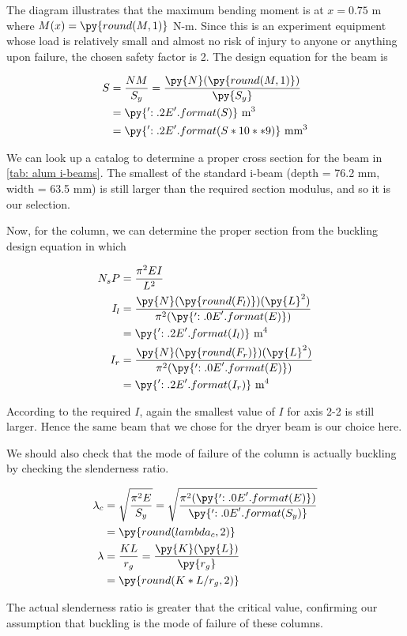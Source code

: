 \documentclass[
10pt,
a4paper,
openany,
svgnames,
]{book}
\begin{document}
\begin{solution}
  The diagram illustrates that the maximum bending moment is at $x = 0.75$ m where $M(x) = \py{round(M,1)}$ N-m. Since this is an experiment equipment whose load is relatively small and almost no risk of injury to anyone or anything upon failure, the chosen safety factor is 2. The design equation for the beam is

  \begin{align*}
    S &= \frac{N M}{S_y} = \frac{\py{N}(\py{round(M,1)})}{\py{S_y}} \\
      &= \py{'{:.2E}'.format(S)} \text{ m}^3 \\
      &= \py{'{:.2E}'.format(S*10**9)} \text{ mm}^3
  \end{align*}

  We can look up a catalog to determine a proper cross section for the beam in \cref{tab: alum i-beams}. The smallest of the standard i-beam (depth = 76.2 mm, width = 63.5 mm) is still larger than the required section modulus, and so it is our selection.

  Now, for the column, we can determine the proper section from the buckling design equation in which

  \begin{align*}
    N_s P &= \frac{\pi^2 EI}{L^2} \\
    I_l &= \frac{\py{N}(\py{round(F_l)})(\py{L}^2)}{\pi^2 (\py{'{:.0E}'.format(E)})} \\
          &= \py{'{:.2E}'.format(I_l)} \text{ m}^4 \\
    I_r &= \frac{\py{N}(\py{round(F_r)})(\py{L}^2)}{\pi^2 (\py{'{:.0E}'.format(E)})} \\
          &= \py{'{:.2E}'.format(I_r)} \text{ m}^4
  \end{align*}

  According to the required $I$, again the smallest value of $I$ for axis 2-2 is still larger. Hence the same beam that we chose for the dryer beam is our choice here.

  We should also check that the mode of failure of the column is actually buckling by checking the slenderness ratio.

  \begin{align*}
    \lambda_c &= \sqrt{ \frac{ \pi^2 E }{S_y}} = \sqrt{ \frac{ \pi^2 (\py{'{:.0E}'.format(E)}) }{\py{'{:.0E}'.format(S_y)}}} \\
              &= \py{round(lambda_c,2)} \\
    \lambda &= \frac{KL}{r_g} = \frac{\py{K}(\py{L})}{\py{r_g}} \\
              &= \py{round(K*L/r_g,2)}
  \end{align*}

  The actual slenderness ratio is greater that the critical value, confirming our assumption that buckling is the mode of failure of these columns.
\end{solution}
\end{document}
